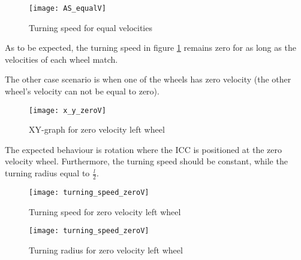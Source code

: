 \begin{figure}[h]
\centering
\texttt{[image: AS\_equalV]}
\caption{Turning speed for equal velocities}
\label{fig::Wv_l=v_r}
\end{figure} 

As to be expected, the turning speed in figure \ref{fig::Wv_l=v_r} remains zero for as long as the velocities of each wheel match.

The other case scenario is when one of the wheels has zero velocity (the other wheel's velocity can not be equal to zero).

\newpage

\begin{figure}[h]
\centering
\texttt{[image: x\_y\_zeroV]}
\caption{XY-graph for zero velocity left wheel}
\label{fig::ZeroV}
\end{figure} 

The expected behaviour is rotation where the ICC is positioned at the zero velocity wheel. Furthermore, the turning speed should be constant, while the turning radius equal to $\frac{l}{2}$.

\begin{figure}[h]
\centering
\texttt{[image: turning\_speed\_zeroV]}
\caption{Turning speed for zero velocity left wheel}
\label{fig::TzeroV}
\end{figure}

\begin{figure}[b]
\centering
\texttt{[image: turning\_speed\_zeroV]}
\caption{Turning radius for zero velocity left wheel}
\label{fig::RzeroV}
\end{figure}

